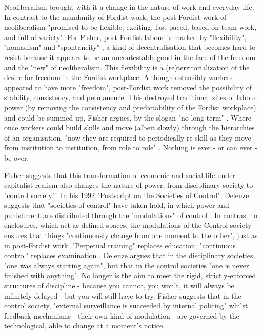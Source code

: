 Neoliberalism brought with it a change in the nature of work and everyday life. In contrast to the mundanity of Fordist work, the post-Fordist work of neoliberalism "promised to be flexible, exciting, fast-paced, based on team-work, and full of variety". For Fisher, post-Fordist labour is marked by "flexibility", "nomadism" and "spontaneity" \citep[28]{fisher_capitalist_2009}, a kind of decentralisation that becomes hard to resist because it appears to be an uncontestable good in the face of the freedom and the "new" of neoliberalism. This flexibility is a (re)territorialization of the desire for freedom in the Fordist workplace. Although ostensibly workers appeared to have more "freedom", post-Fordist work removed the possibility of stability, consistency, and permanence. This destroyed traditional sites of labour power (by removing the consistency and predictability of the Fordist workplace) and could be summed up, Fisher argues, by the slogan "no long term" \citep[36]{fisher_capitalist_2009}. Where once workers could build skills and move (albeit slowly) through the hierarchies of an organisation, "now they are required to periodically re-skill as they move from institution to institution, from role to role" \citep[36]{fisher_capitalist_2009}. Nothing is ever - or can ever - be over.

Fisher suggests that this transformation of economic and social life under capitalist realism also changes the nature of power, from disciplinary society to "control society"'. In his 1992 "Postscript on the Societies of Control", Deleuze suggests that "societies of control" have taken hold, in which power and punishment are distributed through the "modulations" of control \citep[4]{gilles_deleuze_postscript_1992}. In contrast to enclosures, which act as defined spaces, the modulations of the Control society ensures that things "continuously change from one moment to the other", just as in post-Fordist work. "Perpetual training" replaces education; "continuous control" replaces examination \citep[5]{gilles_deleuze_postscript_1992}. Deleuze argues that in the disciplinary societies, "one was always starting again", but that in the control societies "one is never finished with anything". No longer is the aim to meet the rigid, strictly-enforced structures of discipline - because you cannot, you won't, it will always be infinitely delayed - but you will still have to try. Fisher suggests that in the control society, "external surveillance is succeeded by internal policing" \citep[22]{fisher_capitalist_2009} whilst feedback mechanisms - their own kind of modulation - are governed by the technological, able to change at a moment's notice. 

